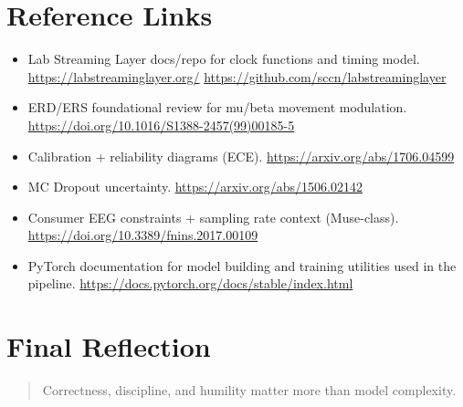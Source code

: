 \documentclass[11pt,openany]{book}
\begin{document}
\chapter{Reference Links}

\begin{itemize}
\item Lab Streaming Layer docs/repo for clock functions and timing model. \url{https://labstreaminglayer.org/} \url{https://github.com/sccn/labstreaminglayer}
\item ERD/ERS foundational review for mu/beta movement modulation. \url{https://doi.org/10.1016/S1388-2457(99)00185-5}
\item Calibration + reliability diagrams (ECE). \url{https://arxiv.org/abs/1706.04599}
\item MC Dropout uncertainty. \url{https://arxiv.org/abs/1506.02142}
\item Consumer EEG constraints + sampling rate context (Muse-class). \url{https://doi.org/10.3389/fnins.2017.00109}
\item PyTorch documentation for model building and training utilities used in the pipeline. \url{https://docs.pytorch.org/docs/stable/index.html}
\end{itemize}

\chapter*{Final Reflection}

\begin{quote}
Correctness, discipline, and humility matter more than model complexity.
\end{quote}
\end{document}
